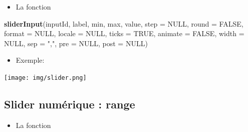\documentclass[
]{article}
\newenvironment{Shaded}{\begin{snugshade}}{\end{snugshade}}
\newcommand{\AttributeTok}[1]{\textcolor[rgb]{0.13,0.29,0.53}{#1}}
\newcommand{\CommentTok}[1]{\textcolor[rgb]{0.56,0.35,0.01}{\textit{#1}}}
\newcommand{\ConstantTok}[1]{\textcolor[rgb]{0.56,0.35,0.01}{#1}}
\newcommand{\DecValTok}[1]{\textcolor[rgb]{0.00,0.00,0.81}{#1}}
\newcommand{\FunctionTok}[1]{\textcolor[rgb]{0.13,0.29,0.53}{\textbf{#1}}}
\newcommand{\NormalTok}[1]{#1}
\newcommand{\StringTok}[1]{\textcolor[rgb]{0.31,0.60,0.02}{#1}}
\providecommand{\tightlist}{%
  \setlength{\itemsep}{0pt}\setlength{\parskip}{0pt}}
\begin{document}
\begin{itemize}
\tightlist
\item
  La fonction
\end{itemize}

\begin{Shaded}
\begin{Highlighting}[]
\FunctionTok{sliderInput}\NormalTok{(inputId, label, min, max, value, }\AttributeTok{step =} \ConstantTok{NULL}\NormalTok{, }\AttributeTok{round =} \ConstantTok{FALSE}\NormalTok{,}
            \AttributeTok{format =} \ConstantTok{NULL}\NormalTok{, }\AttributeTok{locale =} \ConstantTok{NULL}\NormalTok{, }\AttributeTok{ticks =} \ConstantTok{TRUE}\NormalTok{, }\AttributeTok{animate =} \ConstantTok{FALSE}\NormalTok{,}
            \AttributeTok{width =} \ConstantTok{NULL}\NormalTok{, }\AttributeTok{sep =} \StringTok{","}\NormalTok{, }\AttributeTok{pre =} \ConstantTok{NULL}\NormalTok{, }\AttributeTok{post =} \ConstantTok{NULL}\NormalTok{)}
\end{Highlighting}
\end{Shaded}

\begin{itemize}
\tightlist
\item
  Exemple:
\end{itemize}

\begin{Shaded}
\end{Shaded}

\texttt{[image: img/slider.png]}

\hypertarget{slider-numuxe9rique-range}{%
\subsection{Slider numérique : range}\label{slider-numuxe9rique-range}}

\begin{itemize}
\tightlist
\item
  La fonction
\end{itemize}
\end{document}
